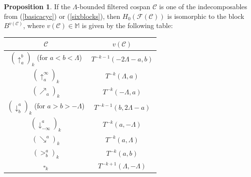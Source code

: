 \documentclass[11pt]{amsart}
\theoremstyle{definition}
\newtheorem{prop}[theorem]{Proposition}
\theoremstyle{remark}
\numberwithin{equation}{section}
\begin{document}
\begin{prop}\label{blockclass}
If the $\Lambda$-bounded filtered cospan $\mathcal{C}$ is one of the indecomposables from (\ref{basicacyc}) or (\ref{sixblocks}), then $H_0(\mathcal{F}(\mathcal{C}))$ is isomorphic to the block $B^{v(\mathcal{C})}$, where $v(\mathcal{C})\in \mathbb{M}$ is given by the following table:
\begin{center}
\begin{tabular}{c|c} $\mathcal{C}$ & $v(\mathcal{C})$  \\ 	\hline $\left(\uparrow_{a}^{b}\right)_k$ (for $a<b<\Lambda$) & $T^{-k-1}(-2\Lambda-a,b)$  \\ \hline $\left(\uparrow_{a}^{\infty}\right)_k$ & $T^{-k}(\Lambda,a)$ \\ 
\hline $\left(\nearrow_{a}\right)_k$ & $T^{-k}(-\Lambda,a)$ \\ \hline $\left(\downarrow^{a}_{b}\right)_{k}$ (for $a>b>-\Lambda$) & $T^{-k-1}(b,2\Lambda-a)$ \\ \hline 
 $\left(\downarrow^{a}_{-\infty}\right)_{k}$ & $T^{-k}(a,-\Lambda)$ \\ \hline $\left(\searrow^{a}\right)_k$ & $T^{-k}(a,\Lambda)$ \\ \hline $\left(>_{b}^{a}\right)_k$ & $T^{-k}(a,b)$ \\ \hline $\square_k$ & $T^{-k+1}(\Lambda,-\Lambda)$ 
\end{tabular}
\end{center}
\end{prop}
\end{document}
